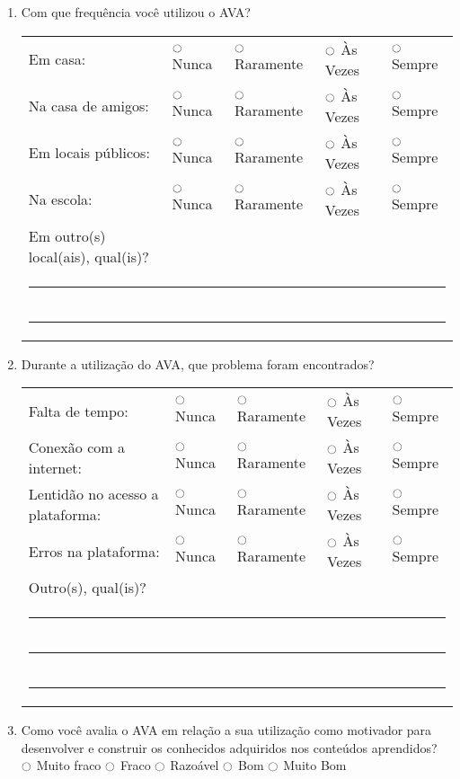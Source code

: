 \begin{enumerate}

\item Com que frequência você utilizou o AVA? \\
\begin{tabular}{lllll}
	Em casa: & $\ocircle$ Nunca & $\ocircle$ Raramente & $\ocircle$ Às Vezes & $\ocircle$ Sempre \\
	Na casa de amigos: & $\ocircle$ Nunca & $\ocircle$ Raramente & $\ocircle$ Às Vezes & $\ocircle$ Sempre \\
	Em locais públicos: & $\ocircle$ Nunca & $\ocircle$ Raramente & $\ocircle$ Às Vezes & $\ocircle$ Sempre \\
	Na escola: & $\ocircle$ Nunca & $\ocircle$ Raramente & $\ocircle$ Às Vezes & $\ocircle$ Sempre \\
	Em outro(s) local(ais), qual(is)? \\
	\multicolumn{5}{l}{\noindent\rule{\textwidth}{0.4pt}} \\
	\multicolumn{5}{l}{\noindent\rule{\textwidth}{0.4pt}} \\
\end{tabular}

\item Durante a utilização do AVA, que problema foram encontrados? \\
\begin{tabular}{lllll}
	Falta de tempo: & $\ocircle$ Nunca & $\ocircle$ Raramente & $\ocircle$ Às Vezes & $\ocircle$ Sempre \\
	Conexão com a internet: & $\ocircle$ Nunca & $\ocircle$ Raramente & $\ocircle$ Às Vezes & $\ocircle$ Sempre \\
	Lentidão no acesso a plataforma: & $\ocircle$ Nunca & $\ocircle$ Raramente & $\ocircle$ Às Vezes & $\ocircle$ Sempre \\
	Erros na plataforma: & $\ocircle$ Nunca & $\ocircle$ Raramente & $\ocircle$ Às Vezes & $\ocircle$ Sempre \\
	Outro(s), qual(is)? \\
	\multicolumn{5}{l}{\noindent\rule{\textwidth}{0.4pt}} \\
	\multicolumn{5}{l}{\noindent\rule{\textwidth}{0.4pt}} \\
	\multicolumn{5}{l}{\noindent\rule{\textwidth}{0.4pt}} \\
\end{tabular}

\item Como você avalia o AVA em relação a sua utilização como motivador para desenvolver e construir os conhecidos adquiridos nos conteúdos aprendidos? \\ 
$\ocircle$ Muito fraco  $\ocircle$ Fraco $\ocircle$ Razoável $\ocircle$ Bom $\ocircle$ Muito Bom
 

\end{enumerate}

